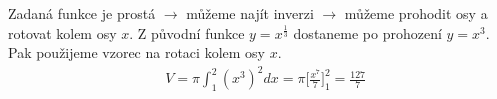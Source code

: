 \documentclass[a4paper]{article}
\begin{document}
\text{}\vspace{-0.1cm}
{\fontsize{12}{15}\selectfont \hspace{-0.5cm}}
\section{}
Zadaná funkce je prostá $\rightarrow$ můžeme najít inverzi $\rightarrow$ můžeme prohodit osy a rotovat kolem osy $x$. Z původní funkce $y=x^{\frac{1}{3}}$  dostaneme po prohození $y=x^3$. Pak použijeme vzorec na rotaci kolem osy $x$.
\begin{align*}
&V = \pi \int_1^2 (x^3)^2 dx = \pi \bigg[ \frac{x^7}{7} \bigg]_1^2 = \frac{127}{7} 
\end{align*}

\section{}
\end{document}
